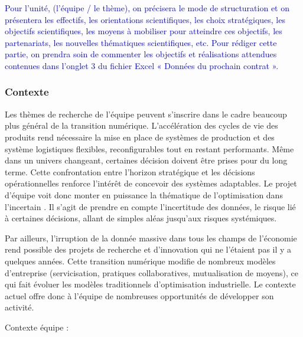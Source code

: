 		

\textcolor{blue}{Pour l’unité, (l’équipe / le thème), on précisera le mode de structuration et on présentera les effectifs, les orientations scientifiques, les choix stratégiques, les objectifs scientifiques, les moyens à mobiliser pour atteindre ces objectifs, les partenariats, les nouvelles thématiques scientifiques, etc.
Pour rédiger cette partie, on prendra soin de commenter les objectifs et réalisations attendues contenues dans l’onglet 3 du fichier Excel « Données du prochain contrat ».}



\subsubsection{Contexte}
		
		Les thèmes de recherche de l'équipe peuvent s'inscrire dans le cadre beaucoup plus général de la transition numérique. 
		L'accélération des cycles de vie des produits rend nécessaire la mise en place de systèmes de production et des système logistiques flexibles, reconfigurables tout en restant performants. 
		Même dans un univers changeant, certaines décision doivent être prises pour du long terme. 
		Cette confrontation entre l'horizon stratégique et les décisions opérationnelles renforce l'intérêt de concevoir des systèmes adaptables. 
		Le projet d'équipe voit donc monter en puissance la thématique de l'optimisation dans l'incertain . 
		Il s'agit de prendre en compte l'incertitude des données, le risque lié à certaines décisions, allant de simples aléas 	jusqu'aux risques systémiques. 
		
		Par ailleurs, l'irruption de la donnée massive dans tous les champs de l'économie rend possible des projets de recherche et d'innovation qui ne l'étaient pas il y a quelques années. 
		Cette transition numérique modifie de nombreux modèles d'entreprise (servicisation, pratiques collaboratives, mutualisation de moyens), ce qui fait évoluer les modèles traditionnels d'optimisation industrielle. 
		Le contexte actuel offre donc à l'équipe de nombreuses opportunités de développer son activité. 


	Contexte équipe : 
			
